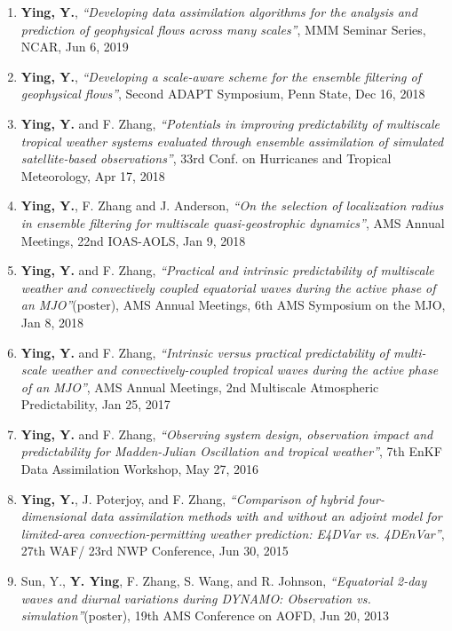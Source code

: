 \begin{enumerate}
\item \textbf{Ying, Y.},
\textit{``Developing data assimilation algorithms for the analysis and prediction of geophysical flows across many scales''},
MMM Seminar Series, NCAR, Jun 6, 2019

\item \textbf{Ying, Y.},
\textit{``Developing a scale-aware scheme for the ensemble filtering of geophysical flows''},
Second ADAPT Symposium, Penn State, Dec 16, 2018

\item \textbf{Ying, Y.} and F. Zhang,
\textit{``Potentials in improving predictability of multiscale tropical weather systems evaluated through ensemble assimilation of simulated satellite-based observations''},
33rd Conf. on Hurricanes and Tropical Meteorology, Apr 17, 2018

\item \textbf{Ying, Y.}, F. Zhang and J. Anderson,
\textit{``On the selection of localization radius in ensemble filtering for multiscale quasi-geostrophic dynamics''},
AMS Annual Meetings, 22nd IOAS-AOLS, Jan 9, 2018

\item \textbf{Ying, Y.} and F. Zhang,
\textit{``Practical and intrinsic predictability of multiscale weather and convectively coupled equatorial waves during the active phase of an MJO''}(poster),
AMS Annual Meetings, 6th AMS Symposium on the MJO, Jan 8, 2018

\item \textbf{Ying, Y.} and F. Zhang,
\textit{``Intrinsic versus practical predictability of multi-scale weather and convectively-coupled tropical waves during the active phase of an MJO''},
AMS Annual Meetings, 2nd Multiscale Atmospheric Predictability, Jan 25, 2017

\item \textbf{Ying, Y.} and F. Zhang,
\textit{``Observing system design, observation impact and predictability for Madden-Julian Oscillation and tropical weather''},
7th EnKF Data Assimilation Workshop, May 27, 2016

\item \textbf{Ying, Y.}, J. Poterjoy, and F. Zhang,
\textit{``Comparison of hybrid four-dimensional data assimilation methods with and without an adjoint model for limited-area convection-permitting weather prediction: E4DVar vs. 4DEnVar''},
27th WAF/ 23rd NWP Conference, Jun 30, 2015

\item Sun, Y., \textbf{Y. Ying}, F. Zhang, S. Wang, and R. Johnson,
\textit{``Equatorial 2-day waves and diurnal variations during DYNAMO: Observation vs. simulation''}(poster),
19th AMS Conference on AOFD, Jun 20, 2013


\end{enumerate}

